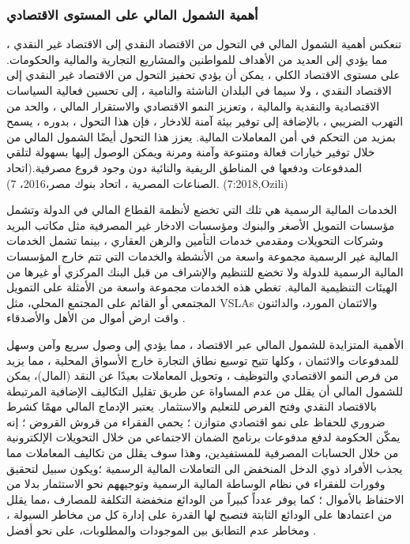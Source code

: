 \documentclass[10pt,a4paper]{report}
\begin{document}
\begin{doublespacing}
\subsubsection{أهمية الشمول المالي على المستوى الاقتصادي}
تنعكس أهمية الشمول المالي في التحول من الاقتصاد النقدي إلى الاقتصاد غير النقدي ، مما يؤدي إلى العديد من الأهداف للمواطنين والمشاريع التجارية والمالية والحكومات. على مستوى الاقتصاد الكلي ، يمكن أن يؤدي تحفيز التحول من الاقتصاد غير النقدي إلى الاقتصاد النقدي ، ولا سيما في البلدان الناشئة والنامية ، إلى تحسين فعالية السياسات الاقتصادية والنقدية والمالية ، وتعزيز النمو الاقتصادي والاستقرار المالي ، والحد من التهرب الضريبي ، بالإضافة إلى توفير بيئة آمنة للادخار ، فإن هذا التحول ، بدوره ، يسمح بمزيد من التحكم في أمن المعاملات المالية. يعزز هذا التحول أيضًا الشمول المالي من خلال توفير خيارات فعالة ومتنوعة وآمنة ومرنة ويمكن الوصول إليها بسهولة لتلقي المدفوعات ودفعها في المناطق الريفية والنائية دون وجود فروع مصرفية.(اتحاد الصناعات المصرية ، اتحاد بنوك مصر،2016، 7). (7:2018,Ozili)

الخدمات المالية الرسمية هي تلك التي تخضع لأنظمة القطاع المالي في الدولة وتشمل مؤسسات التمويل الأصغر والبنوك ومؤسسات الادخار غير المصرفية مثل مكاتب البريد وشركات التحويلات ومقدمي خدمات التأمين والرهن العقاري ، بينما تشمل الخدمات المالية غير الرسمية مجموعة واسعة من الأنشطة والخدمات التي تتم خارج المؤسسات المالية الرسمية للدولة ولا تخضع للتنظيم والإشراف من قبل البنك المركزي أو غيرها من الهيئات التنظيمية المالية. تغطي هذه الخدمات مجموعة واسعة من الأمثلة على التمويل المجتمعي أو القائم على المجتمع المحلي، مثل  VSLAs والائتمان المورد، والدائنون واقت ارض أموال من الأهل والأصدقاء .
 
الأهمية المتزايدة للشمول المالي عبر الاقتصاد ، مما يؤدي إلى وصول سريع وآمن وسهل للمدفوعات والائتمان ، وكلها تتيح توسيع نطاق التجارة خارج الأسواق المحلية ، مما يزيد من فرص النمو الاقتصادي والتوظيف ، وتحويل المعاملات بعيدًا عن النقد (المال)، يمكن للشمول المالي أن يقلل من عدم المساواة عن طريق تقليل التكاليف الإضافية المرتبطة بالاقتصاد النقدي وفتح الفرص للتعليم والاستثمار. يعتبر الإدماج المالي مهمًا كشرط ضروري للحفاظ على نمو اقتصادي متوازن ؛ يحمي الفقراء من قروش القروض ؛ إنه يمكّن الحكومة لدفع مدفوعات برنامج الضمان الاجتماعي من خلال التحويلات الإلكترونية من خلال الحسابات المصرفية للمستفيدين، وهذا سوف يقلل من تكاليف المعاملات مما يجذب الأفراد ذوي الدخل المنخفض الى التعاملات المالية الرسمية ؛ويكون سبيل لتحقيق وفورات للفقراء في نظام الوساطة المالية الرسمية وتوجيههم نحو الاستثمار بدلا من الاحتفاظ بالأموال ؛ كما يوفر عدداً كبيراً من الودائع منخفضة التكلفة للمصارف ،مما يقلل من اعتمادها على الودائع الثابتة فتصبح لها القدرة على إدارة كل من مخاطر السيولة ، ومخاطر عدم التطابق بين الموجودات والمطلوبات، على نحو أفضل .

\end{doublespacing}
\end{document}
